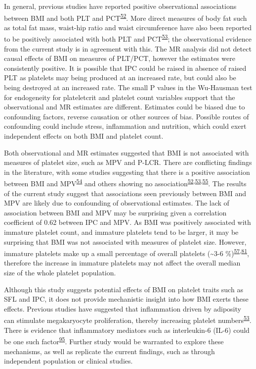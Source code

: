 \documentclass[11pt,twoside]{bristolthesis}
\begin{document}
In general, previous studies have reported positive observational associations between BMI and both PLT and PCT\textsuperscript{\protect\hyperlink{ref-Furuncuoglu2016}{52}}. More direct measures of body fat such as total fat mass, waist-hip ratio and waist circumference have also been reported to be positively associated with both PLT and PCT\textsuperscript{\protect\hyperlink{ref-Han2018a}{53}}; the observational evidence from the current study is in agreement with this. The MR analysis did not detect causal effects of BMI on measures of PLT/PCT, however the estimates were consistently positive. It is possible that IPC could be raised in absence of raised PLT as platelets may being produced at an increased rate, but could also be being destroyed at an increased rate. The small P values in the Wu-Hausman test for endogeneity for plateletcrit and platelet count variables support that the observational and MR estimates are different. Estimates could be biased due to confounding factors, reverse causation or other sources of bias. Possible routes of confounding could include stress, inflammation and nutrition, which could exert independent effects on both BMI and platelet count.

Both observational and MR estimates suggested that BMI is not associated with measures of platelet size, such as MPV and P-LCR. There are conflicting findings in the literature, with some studies suggesting that there is a positive association between BMI and MPV\textsuperscript{\protect\hyperlink{ref-Coban2005}{54}} and others showing no association\textsuperscript{\protect\hyperlink{ref-Furuncuoglu2016}{52},\protect\hyperlink{ref-Han2018a}{53},\protect\hyperlink{ref-Heffron2018}{55}}. The results of the current study suggest that associations seen previously between BMI and MPV are likely due to confounding of observational estimates. The lack of association between BMI and MPV may be surprising given a correlation coefficient of 0.62 between IPC and MPV. As BMI was positively associated with immature platelet count, and immature platelets tend to be larger, it may be surprising that BMI was not associated with measures of platelet size. However, immature platelets make up a small percentage of overall platelets (\textasciitilde3-6 \%)\textsuperscript{\protect\hyperlink{ref-Ibrahim2014}{57},\protect\hyperlink{ref-Bernlochner2015a}{81}}, therefore the increase in immature platelets may not affect the overall median size of the whole platelet population.

Although this study suggests potential effects of BMI on platelet traits such as SFL and IPC, it does not provide mechanistic insight into how BMI exerts these effects. Previous studies have suggested that inflammation driven by adiposity can stimulate megakaryocyte proliferation, thereby increasing platelet numbers\textsuperscript{\protect\hyperlink{ref-Han2018a}{53}}. There is evidence that inflammatory mediators such as interleukin-6 (IL-6) could be one such factor\textsuperscript{\protect\hyperlink{ref-Kaser2001}{95}}. Further study would be warranted to explore these mechanisms, as well as replicate the current findings, such as through independent population or clinical studies.
\end{document}
